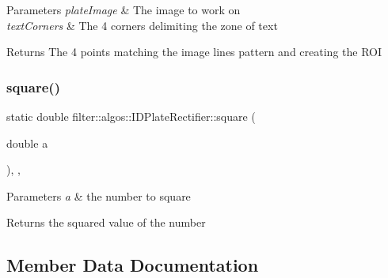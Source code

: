 \begin{DoxyParams}{Parameters}
{\em plate\+Image} & The image to work on \\
\hline
{\em text\+Corners} & The 4 corners delimiting the zone of text \\
\hline
\end{DoxyParams}
\begin{DoxyReturn}{Returns}
The 4 points matching the image lines pattern and creating the R\+OI 
\end{DoxyReturn}
\mbox{\label{classfilter_1_1algos_1_1_i_d_plate_rectifier_afdcacb5df472665d8e9dc7635e3474bf}} 
\subsubsection{\texorpdfstring{square()}{square()}}
{\footnotesize\ttfamily static double filter\+::algos\+::\+I\+D\+Plate\+Rectifier\+::square (\begin{DoxyParamCaption}\item[{double}]{a }\end{DoxyParamCaption})\hspace{0.3cm}{\ttfamily [inline]}, {\ttfamily [static]}, {\ttfamily [private]}}


\begin{DoxyParams}{Parameters}
{\em a} & the number to square \\
\hline
\end{DoxyParams}
\begin{DoxyReturn}{Returns}
the squared value of the number 
\end{DoxyReturn}


\subsection{Member Data Documentation}
\mbox{\label{classfilter_1_1algos_1_1_i_d_plate_rectifier_a8572bfa44fbd8e1aa65b61f94304fd95}} 
